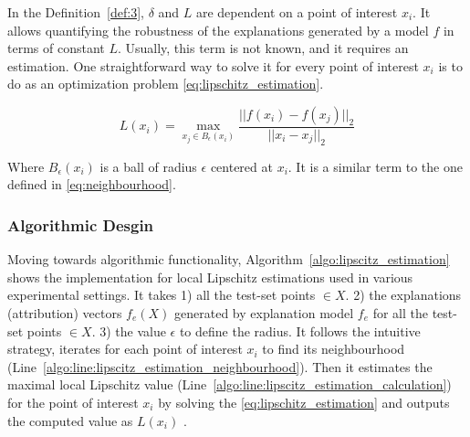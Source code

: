 \documentclass[english]{tktltiki2}
\theoremstyle{definition}
\theoremstyle{remark}
\begin{document}
In the Definition~\ref{def:3}, $\delta$ and $L$ are dependent on a point of interest $x_i$. It allows quantifying the robustness of the explanations generated by a model $f$ in terms of constant $L$. Usually, this term is not known, and it requires an estimation. One straightforward way to solve it for every point of interest $x_i$ is to do as an optimization problem \eqref{eq:lipschitz_estimation}.


\begin{equation}\label{eq:lipschitz_estimation}
L(x_i) = \operatorname*{max}_{x_j \in B_{\epsilon}(x_i)}  \frac{||f(x_i) - f(x_j)||_{2}}{||x_i - x_j||_{2}}
\end{equation}

Where $B_{\epsilon}(x_{i})$ is a ball of radius $\epsilon$ centered at $x_i$. It is a similar term to the one defined in \eqref{eq:neighbourhood}. 

\subsubsection{Algorithmic Desgin}\label{sec:algorithmic_desgin} %
Moving towards algorithmic functionality, Algorithm~\ref{algo:lipscitz_estimation} shows the implementation for local Lipschitz estimations used in various experimental settings. It takes 1) all the test-set points $ \in X$. 2) the explanations (attribution) vectors $f_e(X)$ generated by explanation model $f_e$  for all the test-set points $\in X$. 3) the value $\epsilon$ to define the radius. It follows the intuitive strategy, iterates for each point of interest $x_i$ to find its neighbourhood (Line~\ref{algo:line:lipscitz_estimation_neighbourhood}). Then it estimates the maximal local Lipschitz value (Line~\ref{algo:line:lipscitz_estimation_calculation}) for the point of interest $x_i$ by solving the \eqref{eq:lipschitz_estimation} and outputs the computed value as $L(x_i)$ .
\end{document}

